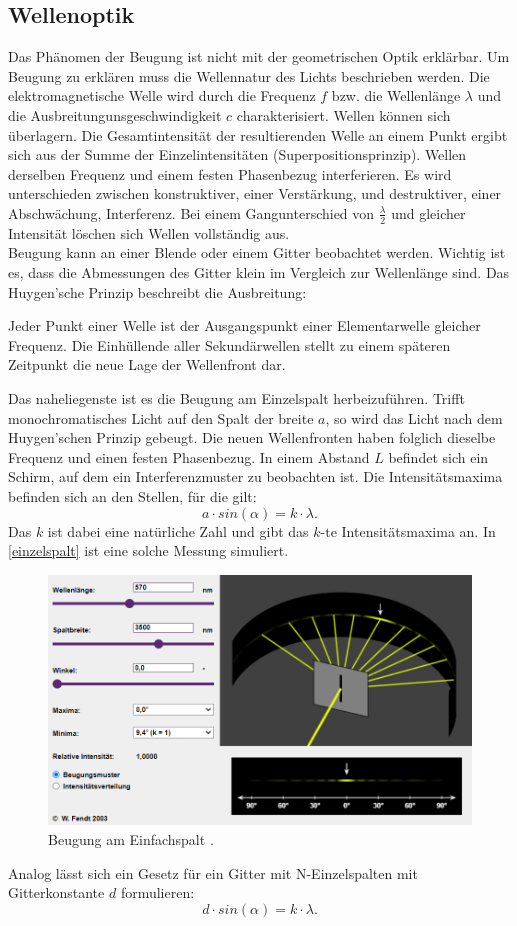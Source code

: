 \subsection{Wellenoptik}
Das Phänomen der Beugung ist nicht mit der geometrischen Optik erklärbar. Um Beugung zu erklären muss die Wellennatur des Lichts beschrieben werden.
Die elektromagnetische Welle wird durch die Frequenz $f$ bzw. die Wellenlänge $\lambda$ und die Ausbreitungunsgeschwindigkeit $c$ charakterisiert.
Wellen können sich überlagern. Die Gesamtintensität der resultierenden Welle an einem Punkt ergibt sich aus der Summe der Einzelintensitäten (Superpositionsprinzip).
Wellen derselben Frequenz und einem festen Phasenbezug interferieren. Es wird unterschieden zwischen konstruktiver, einer Verstärkung, und destruktiver, einer
Abschwächung, Interferenz. Bei einem Gangunterschied von $\frac{\lambda}{2}$ und gleicher Intensität löschen sich Wellen vollständig aus.\\
Beugung kann an einer Blende oder einem Gitter beobachtet werden. Wichtig ist es, dass die Abmessungen des Gitter klein im Vergleich zur Wellenlänge sind. Das Huygen'sche 
Prinzip beschreibt die Ausbreitung:\\
\begin{itshape}
    Jeder Punkt einer Welle ist der Ausgangspunkt einer Elementarwelle gleicher Frequenz. Die Einhüllende aller Sekundärwellen stellt zu einem späteren Zeitpunkt die
    neue Lage der Wellenfront dar.
\end{itshape}
Das naheliegenste ist es die Beugung am Einzelspalt herbeizuführen. Trifft monochromatisches Licht auf den Spalt der breite $a$, so wird das Licht nach dem Huygen'schen 
Prinzip gebeugt. Die neuen Wellenfronten haben folglich dieselbe Frequenz und einen festen Phasenbezug. In einem Abstand $L$ befindet sich ein Schirm, auf dem ein 
Interferenzmuster zu beobachten ist. Die Intensitätsmaxima befinden sich an den Stellen, für die gilt:
\begin{equation*}
    a \cdot sin(\alpha) = k\cdot\lambda.
\end{equation*}
Das $k$ ist dabei eine natürliche Zahl und gibt das $k\text{-te}$ Intensitätsmaxima an. In \autoref{einzelspalt} ist eine solche Messung simuliert.
\begin{figure}[H]
    \centering
    \includegraphics[width=\textwidth]{img/beugung.png}
    \caption{Beugung am Einfachspalt \cite{Einzelspalt}.}
    \label{einzelspalt}
\end{figure}
Analog lässt sich ein Gesetz für ein Gitter mit N-Einzelspalten mit Gitterkonstante $d$ formulieren:
\begin{equation}\label{eq:gitter}
    d \cdot sin(\alpha) = k\cdot\lambda.
\end{equation}
